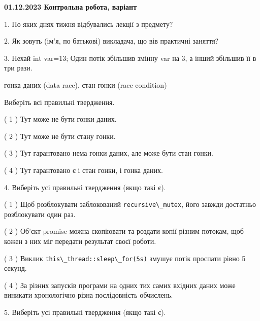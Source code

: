 \documentclass[12pt, ukrainian]{article}
\def\code#1{\Verb!#1!}
\begin{document}
\vspace{4mm}
\newpage
\begin {large}

\textbf{01.12.2023 Контрольна робота, варіант  }\par


{
1. По яких днях тижня відбувались лекції з предмету?



\vspace{5mm}
2. Як зовуть (ім'я, по батькові) викладача, що вів практичні заняття?



\vspace{5mm}
3. Нехай int var=13; Один потік збільшив змінну var на 3, а інший збільшив її в три рази.

гонка даних (data race), стан гонки (race condition)

Виберіть всі правильні твердження.\par
\vspace{2mm}
( 1 ) Тут може не бути гонки даних.%

( 2 ) Тут може не бути стану гонки.%

( 3 ) Тут гарантовано нема гонки даних, але може бути стан гонки.%

( 4 ) Тут гарантовано є і стан гонки, і гонка даних.%


\vspace{5mm}
4. Виберіть усі правильні твердження (якщо такі є).\par
\vspace{2mm}

( 1 ) Щоб розблокувати заблокований \code{recursive\_mutex}, його завжди достатньо розблокувати один раз.%

( 2 ) Об’єкт promise можна скопіювати та роздати копії різним потокам, щоб кожен з них міг передати результат своєї роботи.%

( 3 ) Виклик \code{this\_thread::sleep\_for(5s)} змушує потік проспати рівно 5 секунд.%

( 4 ) За різних запусків програми на одних тих самих вхідних даних може виникати хронологічно різна послідовність обчислень.%


\vspace{5mm}
5. Виберіть усі правильні твердження (якщо такі є).\par
\vspace{2mm}

}
\end{large}
\end{document}

